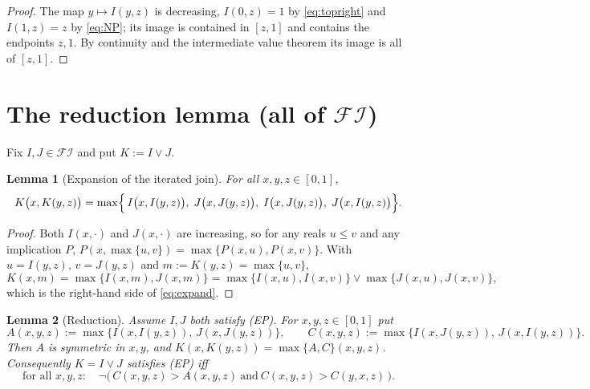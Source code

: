 \documentclass{amsart}
\theoremstyle{plain}
\newtheorem{lemma}{Lemma}
\theoremstyle{definition}
\newcommand{\FI}{\mathcal{FI}}
\begin{document}
\begin{proof}
The map $y\mapsto I(y,z)$ is decreasing, $I(0,z)=1$ by \eqref{eq:topright} and $I(1,z)=z$
by \eqref{eq:NP}; its image is contained in $[z,1]$ and contains the endpoints $z,1$. By
continuity and the intermediate value theorem its image is all of $[z,1]$.
\end{proof}

\section{The reduction lemma (all of $\FI$)}\label{sec:reduction}

Fix $I,J\in\FI$ and put $K:=I\vee J$.

\begin{lemma}[Expansion of the iterated join]\label{lem:identity}
For all $x,y,z\in[0,1]$,
\begin{equation}\label{eq:expand}
K\bigl(x,K(y,z)\bigr)=\max\Bigl\{\,I\bigl(x,I(y,z)\bigr),\;J\bigl(x,J(y,z)\bigr),\;
I\bigl(x,J(y,z)\bigr),\;J\bigl(x,I(y,z)\bigr)\Bigr\}.
\end{equation}
\end{lemma}

\begin{proof}
Both $I(x,\cdot)$ and $J(x,\cdot)$ are increasing, so for any reals $u\le v$ and any
implication $P$, $P(x,\max\{u,v\})=\max\{P(x,u),P(x,v)\}$. With $u=I(y,z)$, $v=J(y,z)$ and
$m:=K(y,z)=\max\{u,v\}$,
\[
K(x,m)=\max\{I(x,m),J(x,m)\}
      =\max\{I(x,u),I(x,v)\}\vee\max\{J(x,u),J(x,v)\},
\]
which is the right-hand side of \eqref{eq:expand}.
\end{proof}

\begin{lemma}[Reduction]\label{lem:reduction}
Assume $I,J$ both satisfy \textup{(EP)}. For $x,y,z\in[0,1]$ put
\[
A(x,y,z):=\max\{I(x,I(y,z)),\,J(x,J(y,z))\},\qquad
C(x,y,z):=\max\{I(x,J(y,z)),\,J(x,I(y,z))\}.
\]
Then $A$ is symmetric in $x,y$, and $K(x,K(y,z))=\max\{A,C\}(x,y,z)$. Consequently
$K=I\vee J$ satisfies \textup{(EP)} iff
\begin{equation}\label{eq:star}
\text{for all }x,y,z:\quad
\neg\bigl(\,C(x,y,z)>A(x,y,z)\ \text{and}\ C(x,y,z)>C(y,x,z)\,\bigr).
\tag{$\star$}
\end{equation}
\end{lemma}
\end{document}
